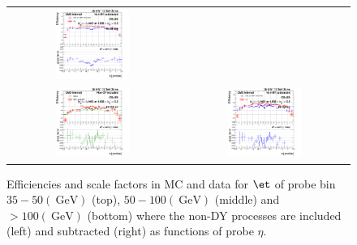 \begin{figure}[bh]
\begin{center}
\begin{tabular}{cc}
      \includegraphics[width=0.45\textwidth]{figures/Zprime/2016/ScaleFactor/SameSign/eta_Et_bins/g_compare_cut_eta_Barrel+Endcap_ea_ta_exc_AS_ProbeEt_50_100_PUW.png}\\
      \includegraphics[width=0.45\textwidth]{figures/Zprime/2016/ScaleFactor/SameSign/eta_Et_bins/g_compare_cut_eta_Barrel+Endcap_ea_ta_inc_AS_ProbeEt_100_inf_PUW.png} &
      \includegraphics[width=0.45\textwidth]{figures/Zprime/2016/ScaleFactor/SameSign/eta_Et_bins/g_compare_cut_eta_Barrel+Endcap_ea_ta_exc_AS_ProbeEt_100_inf_PUW.png}
    \end{tabular}
    \caption{Efficiencies and scale factors in MC and data for $\et$ of probe bin $35-50 (~\mathrm{GeV})$ (top), $50-100 (~\mathrm{GeV})$ (middle) and $>100 (~\mathrm{GeV})$ (bottom) where the non-DY processes are included (left) and subtracted (right) as functions of probe $\eta$.}
    \label{fig:eta_Et_bins_2016}
  \end{center}
\end{figure}

